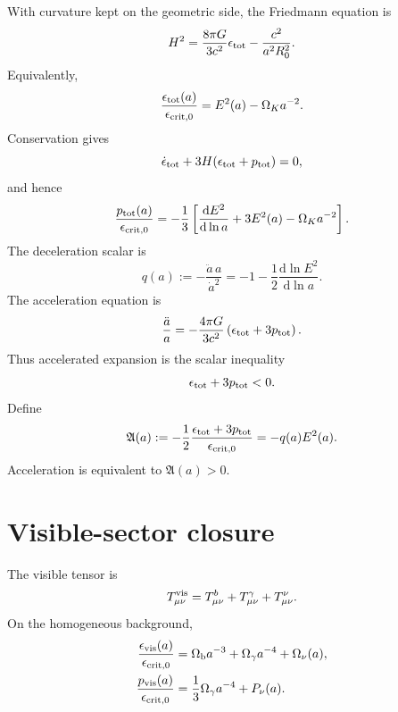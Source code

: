 \documentclass[
  aps,
  prd,
  reprint,
  superscriptaddress,
  nofootinbib,
  floatfix,
  longbibliography
]{revtex4-2}
\theoremstyle{plain}
\theoremstyle{definition}
\theoremstyle{remark}
\newcommand{\dd}{\mathrm d}
\newcommand{\crit}{\epsilon_{\mathrm{crit},0}}
\newcommand{\Omk}{\Omega_K}
\newcommand{\Ob}{\Omega_{\rm b}}
\newcommand{\Og}{\Omega_\gamma}
\newcommand{\Onu}{\Omega_\nu}
\newcommand{\Aacc}{\mathfrak A}
\begin{document}
With curvature kept on the geometric side, the Friedmann equation is
\cite{Wald1984,Peebles1993,DodelsonSchmidt2020,Weinberg2008}
\begin{equation}
H^2=\frac{8\pi G}{3c^2}\epsilon_{\rm tot}
-\frac{c^2}{a^2R_0^2}.
\label{eq:friedmann}
\end{equation}
Equivalently,
\begin{equation}
\frac{\epsilon_{\rm tot}(a)}{\crit}=E^2(a)-\Omk a^{-2}.
\label{eq:etot}
\end{equation}
Conservation gives
\begin{equation}
\dot\epsilon_{\rm tot}+3H(\epsilon_{\rm tot}+p_{\rm tot})=0,
\label{eq:conservation}
\end{equation}
and hence
\begin{equation}
\frac{p_{\rm tot}(a)}{\crit}
=-\frac13\left[\frac{\dd E^2}{\dd\ln a}+3E^2(a)-\Omk a^{-2}\right].
\label{eq:ptot}
\end{equation}
The deceleration scalar is
\begin{equation}
q(a):=-\frac{\ddot a\,a}{\dot a^2}
=-1-\frac12\frac{\dd\ln E^2}{\dd\ln a}.
\label{eq:q}
\end{equation}
The acceleration equation is
\begin{equation}
\frac{\ddot a}{a}=-\frac{4\pi G}{3c^2}
\left(\epsilon_{\rm tot}+3p_{\rm tot}\right).
\label{eq:accel}
\end{equation}
Thus accelerated expansion is the scalar inequality
\begin{equation}
\epsilon_{\rm tot}+3p_{\rm tot}<0.
\label{eq:accel_condition}
\end{equation}
Define
\begin{equation}
\Aacc(a):=-\frac{1}{2}\frac{\epsilon_{\rm tot}+3p_{\rm tot}}{\crit}
=-q(a)E^2(a).
\label{eq:Aacc}
\end{equation}
Acceleration is equivalent to $\Aacc(a)>0$.

\section{Visible-sector closure}

The visible tensor is
\begin{equation}
T^{\rm vis}_{\mu\nu}=T^b_{\mu\nu}+T^\gamma_{\mu\nu}+T^\nu_{\mu\nu}.
\label{eq:visible}
\end{equation}
On the homogeneous background,
\begin{align}
\frac{\epsilon_{\rm vis}(a)}{\crit}
&=\Ob a^{-3}+\Og a^{-4}+\Onu(a),
\nonumber\\
\frac{p_{\rm vis}(a)}{\crit}
&=\frac13\Og a^{-4}+P_\nu(a).
\label{eq:visible_background}
\end{align}
\end{document}
